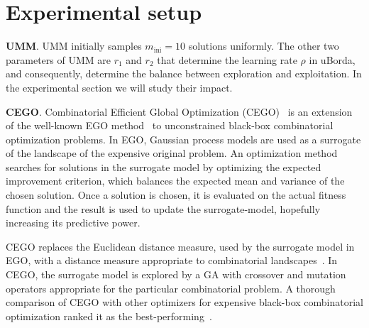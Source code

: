 \documentclass[sigconf,dvipsnames]{acmart}
\newcommand{\minit}{\ensuremath{m_\text{ini}}\xspace}
\begin{document}





\newcommand{\myparagraph}[1]{\smallskip{}\noindent\textbf{#1}.}


\section{Experimental setup}\label{sec:setup}

\myparagraph{UMM}
%
UMM initially samples $\minit=10$ solutions uniformly.
The other two parameters of UMM are $r_1$ and $r_2$ that determine the learning rate $\rho$ in uBorda, and consequently, determine the
balance between exploration and exploitation. In the experimental section we
will study their impact.


\myparagraph{CEGO}
%
Combinatorial Efficient Global Optimization (CEGO)~\citep{ZaeStoFriFisNauBar2014} is an extension of the well-known EGO
method~\citep{JonSchWel98go} to unconstrained black-box combinatorial
optimization problems. In EGO, Gaussian process models are used as a surrogate
of the landscape of the expensive original problem. An optimization method
searches for solutions in the surrogate model by optimizing the expected
improvement criterion, which balances the expected mean and variance of the
chosen solution. Once a solution is chosen, it is evaluated on the actual
fitness function and the result is used to update the surrogate-model,
hopefully increasing its predictive power.

CEGO replaces the Euclidean distance measure, used by the surrogate model in
EGO, with a distance measure appropriate to combinatorial
landscapes~\citep{ZaeStoBar2014:ppsn}.
%
In CEGO, the surrogate model is
explored by a GA with crossover and mutation operators appropriate for the
particular combinatorial problem. A thorough comparison of CEGO
with other optimizers for expensive black-box combinatorial optimization ranked
it as the best-performing~\citep{ZaeStoFriFisNauBar2014}.
\end{document}
